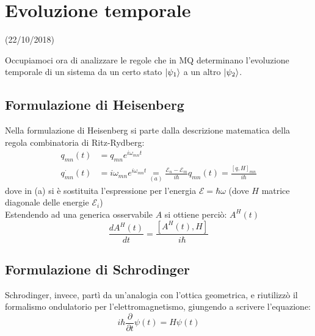 \documentclass[../../FisicaTeorica.tex]{subfiles}
\begin{document}
\section{Evoluzione temporale}
\vspace{-1em}
\begin{center}
    \small{(22/10/2018)}
\end{center}
Occupiamoci ora di analizzare le regole che in MQ determinano l'evoluzione temporale di un sistema da un certo stato $\ket{\psi_1}$ a un altro $\ket{\psi_2}$.

\subsection{Formulazione di Heisenberg}
Nella formulazione di Heisenberg si parte dalla descrizione matematica della regola combinatoria di Ritz-Rydberg:
\begin{align*}
q_{mn}\left(t\right)&=q_{mn}e^{i\omega_{mn}t}\\
\dot{q_{mn}}\left(t\right)&=i\omega_{mn}e^{i\omega_{mn}t}\underset{(a)}{=}
\frac{\mathcal{E}_n-\mathcal{E}_m}{i\hbar}q_{mn}\left(t\right)=\frac{\left[q,H\right]_{mn}}{i\hbar}
\end{align*}
dove in (a) si è sostituita l'espressione per l'energia $\mathcal{E}=\hbar \omega$
(dove $H$ matrice diagonale delle energie $\mathcal{E}_i$)\\
Estendendo ad una generica osservabile $A$ si ottiene perciò:
$A^H\left(t\right)$
\[
\frac{dA^H(t)}{dt}=\frac{[A^H(t), H]}{i\hbar}
\]
\subsection{Formulazione di Schrodinger}
Schrodinger, invece, partì da un'analogia con l'ottica geometrica, e riutilizzò il formalismo ondulatorio per l'elettromagnetismo, giungendo a scrivere l'equazione:
\[
i\hbar \frac{\partial}{\partial t} \psi(t) = H\psi(t)
\]
\end{document}
